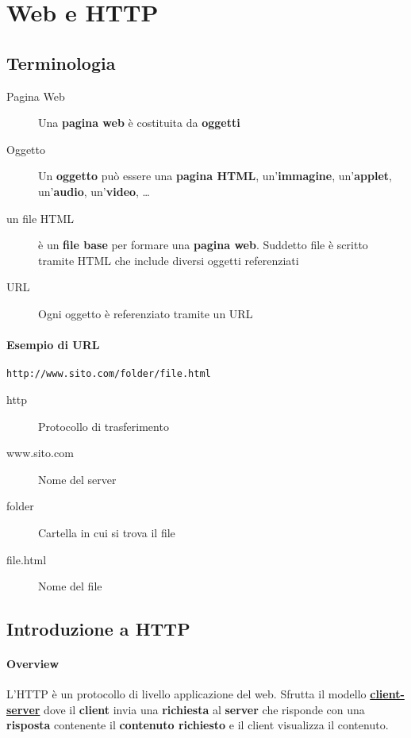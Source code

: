 \section[Web e \texttt{HTTP}]{Web e \Acrshort*{HTTP}}
    \subsection{Terminologia}
        \begin{description}
            \item[Pagina Web] Una \textbf{pagina web} è costituita da \textbf{oggetti}
            \item[Oggetto] Un \textbf{oggetto} può essere una \textbf{pagina \Acrshort*{HTML}}, un'\textbf{immagine}, un'\textbf{applet}, un'\textbf{audio}, un'\textbf{video}, \dots
            \item[un file \Acrshort*{HTML}] è un \textbf{file base} per formare una \textbf{pagina web}. Suddetto file è scritto tramite \acrfull*{HTML} che include diversi oggetti referenziati
            \item[\Acrshort*{URL}] Ogni oggetto è referenziato tramite un \acrfull{URL}    
        \end{description}
        \paragraph{Esempio di \Acrshort*{URL}}
            \begin{center}
                \texttt{http://www.sito.com/folder/file.html}
            \end{center}
            \begin{description}
                \item[http] Protocollo di trasferimento
                \item[www.sito.com] Nome del server
                \item[folder] Cartella in cui si trova il file
                \item[file.html] Nome del file
            \end{description}
    \subsection[Introduzione a HTTP]{Introduzione a \Acrshort*{HTTP}}
        \paragraph{Overview} L'\acrfull*{HTTP} è un protocollo di livello applicazione del web. Sfrutta il modello \textbf{\hyperref[subsubsec:clientServer]{client-server}} dove il \textbf{client} invia una \textbf{richiesta} al \textbf{server} che risponde con una \textbf{risposta} contenente il \textbf{contenuto richiesto} e il client visualizza il contenuto.
        
